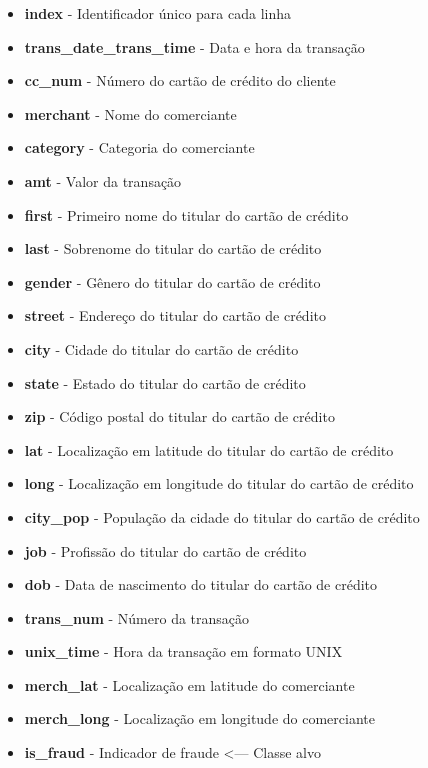 \documentclass[conference]{IEEEtran}
\begin{document}
\begin{itemize}
    \item \textbf{index} - Identificador único para cada linha
    \item \textbf{trans\_date\_trans\_time} - Data e hora da transação
    \item \textbf{cc\_num} - Número do cartão de crédito do cliente
    \item \textbf{merchant} - Nome do comerciante
    \item \textbf{category} - Categoria do comerciante
    \item \textbf{amt} - Valor da transação
    \item \textbf{first} - Primeiro nome do titular do cartão de crédito
    \item \textbf{last} - Sobrenome do titular do cartão de crédito
    \item \textbf{gender} - Gênero do titular do cartão de crédito
    \item \textbf{street} - Endereço do titular do cartão de crédito
    \item \textbf{city} - Cidade do titular do cartão de crédito
    \item \textbf{state} - Estado do titular do cartão de crédito
    \item \textbf{zip} - Código postal do titular do cartão de crédito
    \item \textbf{lat} - Localização em latitude do titular do cartão de crédito
    \item \textbf{long} - Localização em longitude do titular do cartão de crédito
    \item \textbf{city\_pop} - População da cidade do titular do cartão de crédito
    \item \textbf{job} - Profissão do titular do cartão de crédito
    \item \textbf{dob} - Data de nascimento do titular do cartão de crédito
    \item \textbf{trans\_num} - Número da transação
    \item \textbf{unix\_time} - Hora da transação em formato UNIX
    \item \textbf{merch\_lat} - Localização em latitude do comerciante
    \item \textbf{merch\_long} - Localização em longitude do comerciante
    \item \textbf{is\_fraud} - Indicador de fraude \textless--- Classe alvo
\end{itemize}
\end{document}
